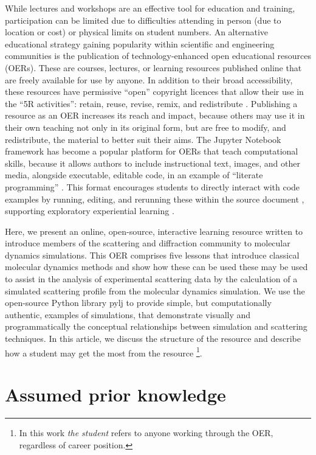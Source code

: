 \documentclass[amsmath,amssymb,twocolumn,superscriptaddress]{revtex4-1}
\begin{document}
While lectures and workshops are an effective tool for education and training, participation can be limited due to difficulties attending in person (due to location or cost) or physical limits on student numbers.
An alternative educational strategy gaining popularity within scientific and engineering communities is the publication of technology-enhanced open educational resources (OERs).
These are courses, lectures, or learning resources published online that are freely available for use by anyone. In addition to their broad accessibility, these resources have permissive ``open'' copyright licences that allow their use in the ``5R activities'': retain, reuse, revise, remix, and redistribute \cite{wiley_open_2018}.
Publishing a resource as an OER increases its reach and impact, because others may use it in their own teaching not only in its original form, but are free to modify, and redistribute, the material to better suit their aims.
The Jupyter Notebook framework \cite{kluyver_jupyter_2016} has become a popular platform for OERs that teach computational skills, because it allows authors to include instructional text, images, and other media, alongside executable, editable code, in an example of ``literate programming'' \cite{knuth_literate_1984}.
This format encourages students to directly interact with code examples by running, editing, and rerunning these within the source document \cite{barba_cybertraining_2017}, supporting exploratory experiential learning \cite{papert_mindstroms_1993}.

Here, we present an online, open-source, interactive learning resource written to introduce members of the scattering and diffraction community to molecular dynamics simulations.
This OER comprises five lessons that introduce classical molecular dynamics methods and show how these can be used these may be used to assist in the analysis of experimental scattering data by the calculation of a simulated scattering profile from the molecular dynamics simulation.
We use the open-source Python library pylj \cite{mccluskey_pylj_2018,mccluskey_arm61/pylj_2019-2} to provide simple, but computationally authentic, examples of simulations, that demonstrate visually and programmatically the conceptual relationships between simulation and scattering techniques.
In this article, we discuss the structure of the resource and describe how a student may get the most from the resource \footnote{In this work \emph{the student} refers to anyone working through the OER, regardless of career position.}.

\section{Assumed prior knowledge}
\end{document}

